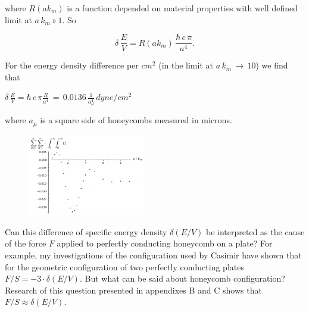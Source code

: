 \documentclass[twoside, 10pt, ptm]{article}
\begin{document}
\begin{multicols}{2}


    where \(R\left(a k_m\right)\) is a function depended on material
properties with well defined limit at \(a\,k_m\,»\,1\). So

    \begin{equation}
\delta\,\frac{E}{V} = R\left(a k_m\right)\,\frac{\hbar\,c\,\pi}{a^4}.
\end{equation}

    For the energy density difference per \(cm^2\) (in the limit at
\(a\,k_m\,\rightarrow \,10\)) we find that

    \(\delta\,\frac{E}{V} = \hbar\,c\, \pi\frac{R}{a^4}\,=\,0.0136\,\frac{1}{a_{\mu}^4}\,dyne/cm^2\)

    where \(a_{\mu}\) is a square side of honeycombs measured in microns.

\begin{figure}
\begin{center}
\includegraphics[width=0.46\textwidth]{sum_sum_int_int_G_on_a_km.png}
\caption{}{}
\end{center}
\label{fig:G_on_a_km}
\end{figure}

    Can this difference of specific energy density
\(\delta\left(E/V\right)\) be interpreted as the cause of the force
\(F\) applied to perfectly conducting honeycomb on a plate? For example,
my investigations of the configuration used by Casimir have shown that for the
geometric configuration of two perfectly conducting plates
\(F/S = -3 \cdot \delta\left(E/V\right)\). But what can be said about honeycomb
configuration? Research of this question presented in appendixes B and C
shows that \(F/S \approx \delta\left(E/V\right)\).


\end{multicols}
\end{document}
